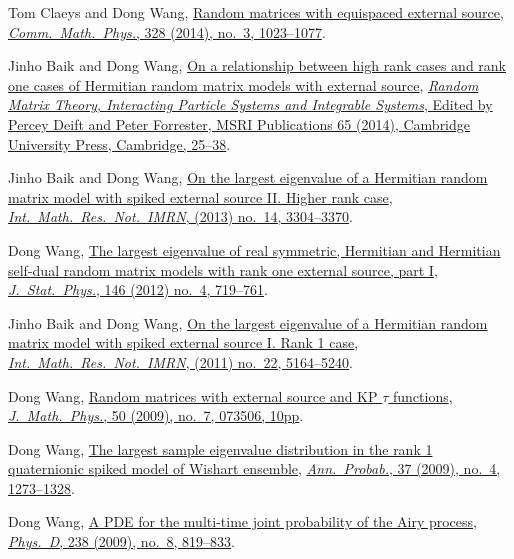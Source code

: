 \begin{etaremune}
\item 
  Tom Claeys and Dong Wang,
  \href{http://arxiv.org/abs/1212.3768}{Random matrices with equispaced external source}, \href{https://doi.org/10.1007/s00220-014-1988-y}{\textit{Comm.\ Math.\ Phys.}, 328 (2014), no.\ 3, 1023--1077}.
\item Jinho Baik and Dong Wang,
  \href{http://arxiv.org/abs/1207.0389}{On a relationship between high rank cases and rank one cases of Hermitian random matrix models with external source}, \href{http://www.cambridge.org/asia/catalogue/catalogue.asp?isbn=9781107079922}{\textit{Random Matrix Theory, Interacting Particle Systems and Integrable Systems}, Edited by Percey Deift and Peter Forrester, MSRI Publications 65 (2014), Cambridge University Press, Cambridge, 25--38}.
\item Jinho Baik and Dong Wang,
  \href{http://arxiv.org/abs/1104.2915}{On the largest eigenvalue of a Hermitian random matrix model with spiked external source II. Higher rank case}, \href{https://doi.org/10.1093/imrn/rns136}{\textit{Int.\ Math.\ Res.\ Not.\ IMRN}, (2013) no.\ 14, 3304--3370}.
\item Dong Wang,
  \href{http://arxiv.org/abs/1012.4144}{The largest eigenvalue of real symmetric, Hermitian and Hermitian self-dual random matrix models with rank one external source, part I}, \href{https://doi.org/10.1007/s10955-012-0417-x}{\textit{J.\ Stat.\ Phys.}, 146 (2012) no.\ 4, 719--761}.
\item Jinho Baik and  Dong Wang,
  \href{http://arxiv.org/abs/1010.4604}{On the largest eigenvalue of a Hermitian random matrix model with spiked external source I. Rank 1 case}, \href{https://doi.org/10.1093/imrn/rnq257}{\textit{Int.\ Math.\ Res.\ Not.\ IMRN}, (2011) no.\ 22, 5164--5240}.
\item Dong Wang,
  \href{http://arxiv.org/abs/0810.0280}{Random matrices with external source and KP $\tau$ functions}, \href{https://doi.org/10.1063/1.3167802}{\textit{J.\ Math.\ Phys.}, 50 (2009), no.\ 7, 073506, 10pp}.
\item Dong Wang,
 \href{http://arxiv.org/abs/0711.2722}{The largest sample eigenvalue distribution in the rank 1 quaternionic spiked model of Wishart ensemble}, \href{https://doi.org/10.1214/08-AOP432}{\textit{Ann.\ Probab.}, 37 (2009), no.\ 4, 1273--1328}.
\item Dong Wang,
  \href{http://arxiv.org/abs/0711.3797}{A PDE for the multi-time joint probability of the Airy process}, \href{https://doi.org/10.1016/j.physd.2009.02.007}{\textit{Phys.\ D}, 238 (2009), no.\ 8, 819--833}.
\end{etaremune}

